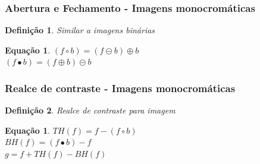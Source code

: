 \documentclass[aspectratio=169]{beamer}
\theoremstyle{Definition}
\newtheorem{defn}{Defini\c c\~ao}
\newtheorem{eq}[theorem]{Equa\c c\~ao}
\begin{document}
\begin{frame}
	\frametitle{Abertura e Fechamento - Imagens monocromáticas}
	
	\begin{defn}
		Similar a imagens binárias
	\end{defn}
	
	\begin{eq}
			$ (f \circ b) =  (f \circleddash b) \oplus b $ \\
			$ (f \bullet b) =  (f \oplus  b) \circleddash b $ 
	\end{eq}
\end{frame}

\begin{frame}
	\frametitle{Realce de contraste - Imagens monocromáticas}
	
	\begin{defn}
		Realce de contraste para imagem
	\end{defn}
	
	\begin{eq}
			$ TH(f) = f - (f \circ b) $ \\
			$ BH(f) = (f \bullet b) - f $ \\
			$ g = f +  TH(f) - BH(f) $ 
	\end{eq}
\end{frame}
\end{document}
